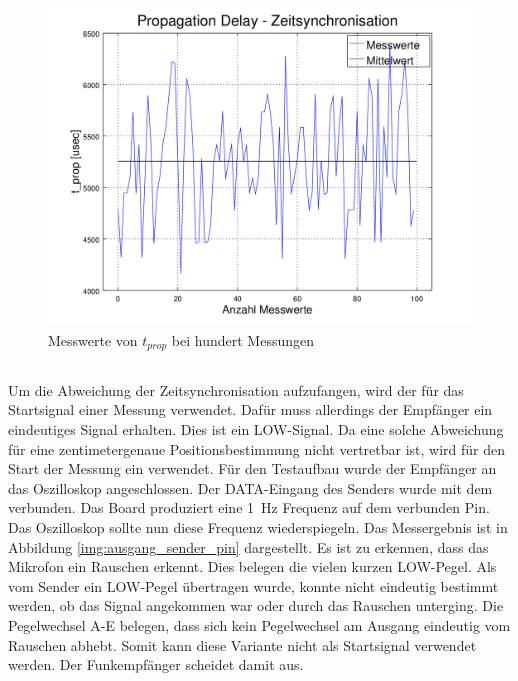 \begin{figure}[H]
        \centering
        \hspace*{-1.7cm}
        \includegraphics[width=1.2\textwidth]{images/t_prop_zeit_sync_figure.png}
        \caption{Messwerte von $t_{prop}$ bei hundert Messungen}
        \label{img:zeit_sync_t_prop_figure}
\end{figure}


\subsection{\funkempfaenger}
Um die Abweichung der Zeitsynchronisation aufzufangen, wird der \funkempfaenger \platz für das Startsignal einer Messung verwendet. Dafür muss allerdings der Empfänger ein eindeutiges Signal erhalten. Dies ist ein \si{LOW}-Signal. Da eine solche Abweichung für eine zentimetergenaue Positionsbestimmung nicht vertretbar ist, wird für den Start der Messung ein \funkempfaenger \platz verwendet. Für den Testaufbau wurde der Empfänger an das Oszilloskop angeschlossen. Der \si{DATA}-Eingang des Senders wurde mit dem \board \platz verbunden. Das Board produziert eine \SI{1}{\hertz} Frequenz auf dem verbunden Pin. Das Oszilloskop sollte nun diese Frequenz wiederspiegeln. Das Messergebnis ist in Abbildung \ref{img:ausgang_sender_pin} dargestellt. Es ist zu erkennen, dass das Mikrofon ein Rauschen erkennt. Dies belegen die vielen kurzen \si{LOW}-Pegel. Als vom Sender ein \si{LOW}-Pegel übertragen wurde, konnte nicht eindeutig bestimmt werden, ob das Signal angekommen war oder durch das Rauschen unterging. Die Pegelwechsel A-E belegen, dass sich kein Pegelwechsel am Ausgang eindeutig vom Rauschen abhebt. Somit kann diese Variante nicht als Startsignal verwendet werden. Der Funkempfänger scheidet damit aus.

